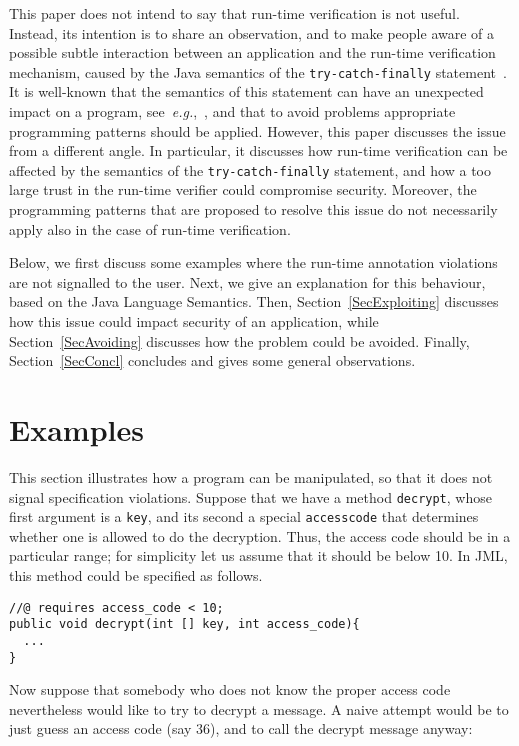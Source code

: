 \documentclass[]{llncs}
\def \unsc      {\symbol{95}}
\begin{document}
This paper does not intend to say that run-time verification is not
useful. Instead, its intention is to share an observation, and to make
people aware of a possible subtle interaction between an application
and the run-time verification mechanism, caused by the Java semantics
of the \texttt{try-catch-finally} statement~\cite{GoslingJSB05}. It is
well-known that the semantics of this statement can have an unexpected
impact on a program, see~\emph{e.g.},~\cite{Eckel02,Jenkov-online},
and that to avoid problems appropriate programming patterns should be
applied. However, this paper discusses the issue from a different
angle. In particular, it discusses how run-time verification can be
affected by the semantics of the \texttt{try-catch-finally} statement,
and how a too large trust in the run-time verifier could compromise
security. Moreover, the programming patterns that are proposed to
resolve this issue do not necessarily apply also in the case of
run-time verification.

Below, we first discuss some examples where the run-time annotation
violations are not signalled to the user. Next, we give an explanation
for this behaviour, based on the Java Language Semantics. Then,
Section~\ref{SecExploiting} discusses how this issue could impact
security of an application, while Section~\ref{SecAvoiding} discusses
how the problem could be avoided. Finally, Section~\ref{SecConcl}
concludes and gives some general observations.

\section{Examples}\label{SecExample}

This section illustrates how a program can be manipulated, so that it
does not signal specification violations. Suppose that we have a
method \texttt{decrypt}, whose first argument is a \texttt{key}, and
its second a special \texttt{access\unsc code} that determines
whether one is allowed to do the decryption. Thus, the access code
should be in a particular range; for simplicity let us assume that it
should be below 10. In JML, this method could be specified as follows.

\begin{verbatim}
//@ requires access_code < 10;
public void decrypt(int [] key, int access_code){
  ...
}
\end{verbatim}


Now suppose that somebody who does not know the proper access code
nevertheless would like to try to decrypt a message. A naive attempt
would be to just guess an access code (say 36), and to call the
decrypt message anyway:
\end{document}
